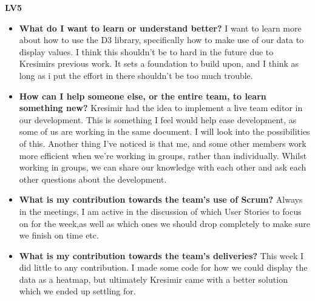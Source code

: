 \documentclass[]{article}
\begin{document}
\textbf{\huge{LV5}}

\begin{itemize}
    \item \textbf{What do I want to learn or understand better?} \newline
    I want to learn more about how to use the D3 library, specifically how to make use of our data to display values. I think this shouldn't be to hard in the future due to Kresimirs previous work. It sets a foundation to build upon, and I think as long as i put the effort in there shouldn't be too much trouble.
    
    \item \textbf{How can I help someone else, or the entire team, to learn something new?} \newline
    Kresimir had the idea to implement a live team editor in our development. This is something I feel would help ease development, as some of us are working in the same document. I will look into the possibilities of this. Another thing I've noticed is that me, and some other members work more efficient when we're working in groups, rather than individually. Whilst working in groups, we can share our knowledge with each other and ask each other questions about the development.
    
    \item \textbf{What is my contribution towards the team’s use of Scrum?} \newline
    Always in the meetings, I am active in the discussion of which User Stories to focus on for the week,as well as which ones we should drop completely to make sure we finish on time etc.
    
    \item \textbf{What is my contribution towards the team’s deliveries?} \newline
    This week I did little to any contribution. I made some code for how we could display the data as a heatmap, but ultimately Kresimir came with a better solution which we ended up settling for.
    

 
 
\end{itemize}
\end{document}

